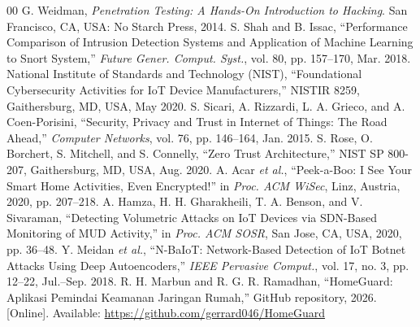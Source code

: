 \documentclass[conference]{IEEEtran}
\begin{document}
\begin{thebibliography}{00}
 G. Weidman, \textit{Penetration Testing: A Hands-On Introduction to Hacking}. San Francisco, CA, USA: No Starch Press, 2014.
 S. Shah and B. Issac, ``Performance Comparison of Intrusion Detection Systems and Application of Machine Learning to Snort System,'' \textit{Future Gener. Comput. Syst.}, vol. 80, pp. 157--170, Mar. 2018.
 National Institute of Standards and Technology (NIST), ``Foundational Cybersecurity Activities for IoT Device Manufacturers,'' NISTIR 8259, Gaithersburg, MD, USA, May 2020.
 S. Sicari, A. Rizzardi, L. A. Grieco, and A. Coen-Porisini, ``Security, Privacy and Trust in Internet of Things: The Road Ahead,'' \textit{Computer Networks}, vol. 76, pp. 146--164, Jan. 2015.
 S. Rose, O. Borchert, S. Mitchell, and S. Connelly, ``Zero Trust Architecture,'' NIST SP 800-207, Gaithersburg, MD, USA, Aug. 2020.
 A. Acar \textit{et al.}, ``Peek-a-Boo: I See Your Smart Home Activities, Even Encrypted!'' in \textit{Proc. ACM WiSec}, Linz, Austria, 2020, pp. 207--218.
 A. Hamza, H. H. Gharakheili, T. A. Benson, and V. Sivaraman, ``Detecting Volumetric Attacks on IoT Devices via SDN-Based Monitoring of MUD Activity,'' in \textit{Proc. ACM SOSR}, San Jose, CA, USA, 2020, pp. 36--48.
 Y. Meidan \textit{et al.}, ``N-BaIoT: Network-Based Detection of IoT Botnet Attacks Using Deep Autoencoders,'' \textit{IEEE Pervasive Comput.}, vol. 17, no. 3, pp. 12--22, Jul.--Sep. 2018.
 R. H. Marbun and R. G. R. Ramadhan, ``HomeGuard: Aplikasi Pemindai Keamanan Jaringan Rumah,'' GitHub repository, 2026. [Online]. Available: \url{https://github.com/gerrard046/HomeGuard}
\end{thebibliography}
\end{document}
